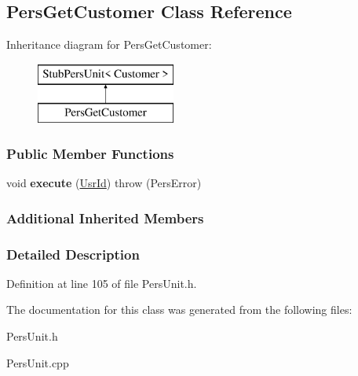 \hypertarget{classPersGetCustomer}{\subsection{Pers\-Get\-Customer Class Reference}
\label{df/dac/classPersGetCustomer}
}
Inheritance diagram for Pers\-Get\-Customer\-:\begin{figure}[H]
\begin{center}
\leavevmode
\includegraphics[height=2.000000cm]{df/dac/classPersGetCustomer}
\end{center}
\end{figure}
\subsubsection*{Public Member Functions}
\begin{DoxyCompactItemize}
\item 
\hypertarget{classPersGetCustomer_a67103ecb49882a8287849fa649cc9047}{void {\bfseries execute} (\hyperlink{classUsrId}{Usr\-Id})  throw (\-Pers\-Error)}\label{df/dac/classPersGetCustomer_a67103ecb49882a8287849fa649cc9047}

\end{DoxyCompactItemize}
\subsubsection*{Additional Inherited Members}


\subsubsection{Detailed Description}


Definition at line 105 of file Pers\-Unit.\-h.



The documentation for this class was generated from the following files\-:\begin{DoxyCompactItemize}
\item 
Pers\-Unit.\-h\item 
Pers\-Unit.\-cpp\end{DoxyCompactItemize}
